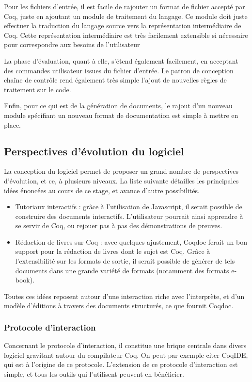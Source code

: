 \documentclass[a4paper, 11pt]{report}
\begin{document}
    Pour les fichiers d'entrée, il est facile de rajouter un format de fichier
    accepté par Coq, juste en ajoutant un module de traitement du langage. Ce
    module doit juste effectuer la traduction du langage source vers la
    représentation intermédiaire de Coq. Cette représentation intermédiaire est
    très facilement extensible si nécessaire pour correspondre aux besoins de
    l'utilisateur

    La phase d'évaluation, quant à elle, s'étend également facilement, en
    acceptant des commandes utilisateur issues du fichier d'entrée. Le patron
    de conception chaîne de contrôle rend également très simple l'ajout de
    nouvelles règles de traitement sur le code.

    Enfin, pour ce qui est de la génération de documents, le rajout
    d'un nouveau module spécifiant un nouveau format de documentation est simple à
    mettre en place.

    \subsection{Perspectives d'évolution du logiciel}
    La conception du logiciel permet de proposer un grand nombre de perspectives
    d'évolution, et ce, à plusieurs niveaux. La liste suivante détailles les
    principales idées énoncées au cours de ce stage, et avance d'autre possibilités.
    \begin{itemize}
      \item Tutoriaux interactifs : grâce à l'utilisation de Javascript,
        il serait possible de construire des documents interactifs.
        L'utilisateur pourrait ainsi apprendre à se servir de Coq, ou rejouer
        pas à pas des démonstrations de preuves.
      \item Rédaction de livres sur Coq : avec quelques ajustement, Coqdoc
        ferait un bon support pour la rédaction de livres dont le sujet est
        Coq. Grâce à l'extensibilité sur les formats de sortie, il serait
        possible de générer de tels documents dans une grande variété de
        formats (notamment des formats e-book).
    \end{itemize}

    Toutes ces idées reposent autour d'une interaction riche avec l'interprète,
    et d'un modèle d'éditions à travers des documents structurés, ce que
    fournit Coqdoc.

    \subsubsection{Protocole d'interaction}
    Concernant le protocole d'interaction, il constitue une brique centrale
    dans divers logiciel gravitant autour du compilateur Coq. On peut par exemple
    citer CoqIDE, qui est à l'origine de ce protocole.
    L'extension de ce protocole d'interaction est simple, et tous les outils
    qui l'utilisent peuvent en bénéficier.
\end{document}
